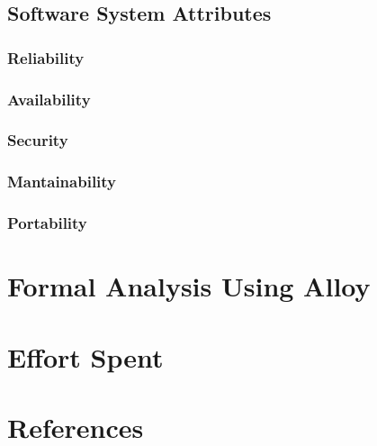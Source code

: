 \documentclass{article}
\begin{document}
	
	
	\subsection{Software System Attributes}
	
	
	
	\subsubsection{Reliability}
	
	
	
	\subsubsection{Availability}
	
	
	
	\subsubsection{Security}
	
	
	
	\subsubsection{Mantainability}
	
	
	
	\subsubsection{Portability}
	
	
	
	\section{Formal Analysis Using Alloy}
			
	
	\section{Effort Spent}
	
	
	
	\section{References}
	
	
\end{document}
